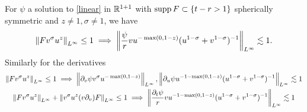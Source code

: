 \documentclass[11pt, oneside]{amsart}
\begin{document}
	\begin{lemma}
		For $\psi$ a solution to \eqref{linear} in $\mathbb{R}^{1+1}$ with $\operatorname{supp} F\subset\{t-r>1\}$ spherically symmetric and $z\neq1,\sigma\neq 1$, we have
		\begin{equation*}
			\begin{aligned}
				\left\lVert Fv^{\sigma}u^{z}\right\rVert_{L^\infty}\leq1\implies \left\lVert \frac{\psi}{r}vu^{-\max(0,1-z)}(u^{1-\sigma}+v^{1-\sigma})^{-1}\right\rVert_{L^\infty}\lesssim 1.
			\end{aligned}
		\end{equation*}
		Similarly for the derivatives
		\begin{equation*}
			\begin{gathered}
				\left\lVert Fv^{\sigma}u^{z}\right\rVert_{L^\infty}\leq1\implies \left\lVert \partial_v\psi v^{\sigma}u^{-\max(0,1-z)}\right\rVert_{L^\infty},\left\lVert \partial_u\psi u^{-1-\max(0,1-z)}(u^{1-\sigma}+v^{1-\sigma})^{-1}\right\rVert_{L^\infty}\lesssim 1 \\
				\left\lVert Fv^{\sigma}u^{z}\right\rVert_{L^\infty}+\left\lVert v^{\sigma}u^{z}(v\partial_v)F\right\rVert_{L^\infty}\leq1\implies \left\lVert \frac{\partial_t\psi}{r}v u^{-1-\max(0,1-z)}(u^{1-\sigma}+v^{1-\sigma})^{-1}\right\rVert_{L^\infty}\lesssim1
			\end{gathered}
		\end{equation*}
	\end{lemma}
\end{document}
